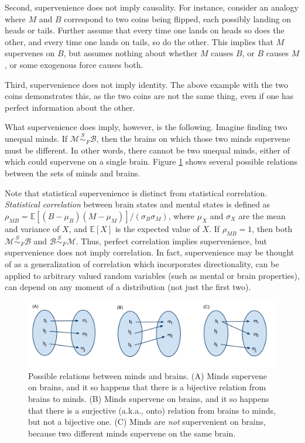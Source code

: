 \documentclass{article}
\newcommand{\EE}{\mathbb{E}}           %
\newcommand{\sig}{\sigma}
\newcommand{\mB}{\mathcal{B}}
\newcommand{\mM}{\mathcal{M}}
\newcommand{\MsB}{\mM \overset{S}{\sim}_{F} \mB}
\begin{document}
Second,  supervenience does not imply causality. %
For instance, consider an analogy where $M$ and $B$ correspond to two coins being flipped, each possibly landing on heads or tails.  Further assume that every time one lands on heads so does the other, and every time one lands on tails, so do the other. This implies that $M$ supervenes on $B$, but assumes nothing about whether $M$ causes $B$, or $B$ causes $M$, or some exogenous force causes both.  

Third, supervenience does not imply identity.  The above example with the two coins demonstrates this, as the two coins are not the same thing, even if one has perfect information about the other.  

What supervenience does imply, however, is the following.   Imagine finding two unequal minds.  If $\MsB$, then the brains on which those two minds supervene must be different.  In other words, there cannot be two unequal minds, either of which could supervene on a single brain.  Figure \ref{fig:rel} shows several possible relations between the sets of minds and brains.


Note that statistical supervenience is distinct from statistical correlation.  \emph{Statistical correlation} between brain states and mental states is defined as $\rho_{MB}=\EE[(B-\mu_B)(M-\mu_M)]/(\sig_B \sig_M)$, where $\mu_X$ and $\sig_X$ are the mean and variance of $X$, and $\EE[X]$ is the expected value of $X$.  If $\rho_{MB}=1$, then both $\MsB$ and $\mB \overset{S}{{\sim}}_{F} \mM$. Thus, perfect correlation implies supervenience, but supervenience does not imply correlation.  In fact, supervenience may be thought of as a generalization of correlation which incorporates directionality, can be applied to arbitrary valued random variables (such as mental or brain properties), can depend on any moment of a distribution (not just the first two).


\begin{figure}[h!tbp]
	\centering
		\includegraphics[width=1\linewidth]{supervenience_relations.pdf}
	\caption{Possible relations between minds and brains.  (A) Minds supervene on brains, and it so happens that there is a bijective relation from brains to minds.  (B) Minds supervene on brains, and it so happens that there is a surjective (a.k.a., onto) relation from brains to minds, but not a bijective one. (C) Minds are \emph{not} supervenient on brains, because two different minds supervene on the same brain.}
	\label{fig:rel}
\end{figure}
\end{document}

